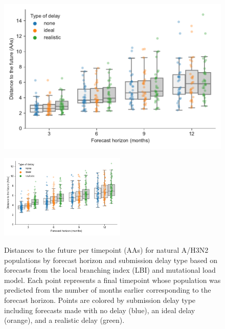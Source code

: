 \documentclass[9pt,lineno]{elife}
\begin{document}
\begin{figure}[htb]
\includegraphics[width=\linewidth]{figures/h3n2_distances_to_the_future_by_delay_and_horizon}
\caption{Distances to the future per timepoint (AAs) for natural A/H3N2 populations by forecast horizon and submission delay type based on forecasts from the local branching index (LBI) and mutational load model.
  Each point represents a final timepoint whose population was predicted from the number of months earlier corresponding to the forecast horizon.
  Points are colored by submission delay type including forecasts made with no delay (blue), an ideal delay (orange), and a realistic delay (green).}
\label{fig:h3n2_distances_to_the_future}
%
{\includegraphics[width=6cm]{figures/simulated_distances_to_the_future_by_delay_and_horizon}}\label{figsupp:simulated_distances_to_the_future}
%
\label{figdata:h3n2_distances_to_the_future}
\label{figsrccode:distances_to_the_future}
\end{figure}
\end{document}
